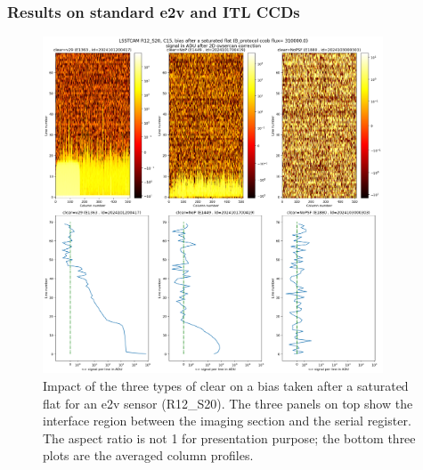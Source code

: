 \subsubsection{Results on standard e2v and ITL CCDs}\label{results-on-standard-e2v-and-itl-ccd}

\begin{figure}
\begin{centering}
\includegraphics[width=0.9\textwidth]{figures/plots_R12_S20_C15_E1880_bias_2024103000303.png}
\end{centering}
\caption{Impact of the three types of clear on a bias
taken after a saturated flat for an e2v sensor (R12\_S20).
The three panels on top show the interface region between the imaging section and the serial register. The aspect ratio is not 1 for presentation purpose; the bottom three plots are the averaged column profiles.}
\label{fig:clear_e2v}
\end{figure}


